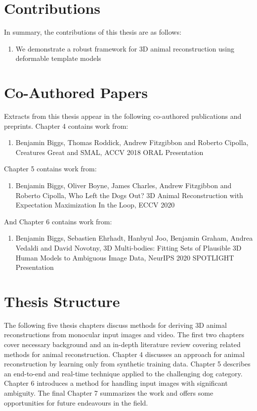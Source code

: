 \section{Contributions}  %
In summary, the contributions of this thesis are as follows:
\begin{enumerate}
    \item We demonstrate a robust framework for 3D animal reconstruction using deformable template models
\end{enumerate}

\section{Co-Authored Papers}  %

Extracts from this thesis appear in the following co-authored publications and preprints. Chapter 4 contains work from:

\begin{enumerate}
    \item Benjamin Biggs, Thomas Roddick, Andrew Fitzgibbon and Roberto Cipolla, Creatures Great and SMAL, ACCV 2018 ORAL Presentation
\end{enumerate}

Chapter 5 contains work from:

\begin{enumerate}
    \item Benjamin Biggs, Oliver Boyne, James Charles, Andrew Fitzgibbon and Roberto Cipolla, Who Left the Dogs Out? 3D Animal Reconstruction with Expectation Maximization In the Loop, ECCV 2020
\end{enumerate}

And Chapter 6 contains work from:

\begin{enumerate}
    \item Benjamin Biggs, Sebastien Ehrhadt, Hanbyul Joo, Benjamin Graham, Andrea Vedaldi and David Novotny, 3D Multi-bodies: Fitting Sets of Plausible 3D Human Models to Ambiguous Image Data, NeurIPS 2020 SPOTLIGHT Presentation
\end{enumerate}

\section{Thesis Structure}  %

The following five thesis chapters discuss methods for deriving 3D animal reconstructions from monocular input images and video. The first two chapters cover necessary background and an in-depth literature review covering related methods for animal reconstruction. Chapter 4 discusses an approach for animal reconstruction by learning only from synthetic training data. Chapter 5 describes an end-to-end and real-time technique applied to the challenging dog category. Chapter 6 introduces a method for handling input images with significant ambiguity. The final Chapter 7 summarizes the work and offers some opportunities for future endeavours in the field.